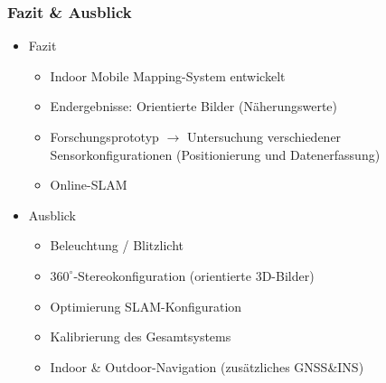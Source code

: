\documentclass[aspectratio=169]{beamer}
\begin{document}
\begin{frame}
\frametitle{Fazit \& Ausblick}
  \begin{itemize}
   \item Fazit
   \begin{itemize}
    \item Indoor Mobile Mapping-System entwickelt
    \item Endergebnisse: Orientierte Bilder (Näherungswerte)
    \pause
    \item Forschungsprototyp $\rightarrow$ Untersuchung verschiedener Sensorkonfigurationen (Positionierung und Datenerfassung)
    \pause
    \item Online-SLAM
   \end{itemize}
   \pause
   \item Ausblick
   \begin{itemize}
    \item Beleuchtung / Blitzlicht
    \pause
    \item $360^\circ$-Stereokonfiguration (orientierte 3D-Bilder)
    \pause
    \item Optimierung SLAM-Konfiguration
    \item Kalibrierung des Gesamtsystems
    \pause
    \item Indoor \& Outdoor-Navigation (zusätzliches GNSS\&INS)
   \end{itemize}
  \end{itemize}
\end{frame}
\end{document}
